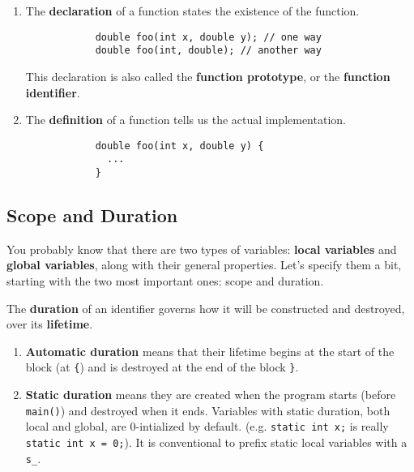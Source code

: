 \documentclass{article}
\begin{document}
    \begin{definition}[Functions]
      \begin{enumerate}
        \item The \textbf{declaration} of a function states the existence of the function. 
          \begin{lstlisting}
            double foo(int x, double y); // one way 
            double foo(int, double); // another way 
          \end{lstlisting}
          This declaration is also called the \textbf{function prototype}, or the \textbf{function identifier}. 

        \item The \textbf{definition} of a function tells us the actual implementation. 
          \begin{lstlisting}
            double foo(int x, double y) {
              ...
            }
          \end{lstlisting}
      \end{enumerate}
    \end{definition}

  \subsection{Scope and Duration}

    You probably know that there are two types of variables: \textbf{local variables} and \textbf{global variables}, along with their general properties. Let's specify them a bit, starting with the two most important ones: scope and duration.  

    \begin{definition}[Duration]
      The \textbf{duration} of an identifier governs how it will be constructed and destroyed, over its \textbf{lifetime}. 
      \begin{enumerate}
        \item \textbf{Automatic duration} means that their lifetime begins at the start of the block (at \texttt{\{}) and is destroyed at the end of the block \texttt{\}}. 
        \item \textbf{Static duration} means they are created when the program starts (before \texttt{main()}) and destroyed when it ends. Variables with static duration, both local and global, are 0-intialized by default. (e.g. \texttt{static int x;} is really \texttt{static int x = 0;}). It is conventional to prefix static local variables with a \texttt{s\_}. 
      \end{enumerate}
    \end{definition} 
\end{document}
